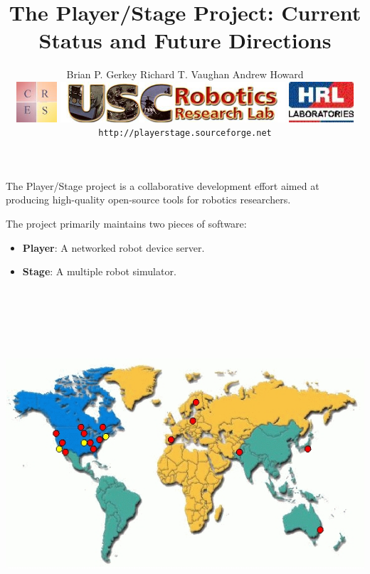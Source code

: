 \documentclass[30pt,landscape,magscalefonts]{foils}
\title{\textcolor{myred}
{\large The Player/Stage Project: Current Status and Future
Directions\vspace*{1em}}}
\author{\small Brian P. Gerkey\hspace{1.5em} Richard T. Vaughan\hspace{1.5em}
Andrew Howard\vspace*{1em}\\
\includegraphics[height=15mm]{cres-logo.jpg}
\includegraphics[height=15mm]{usclogo.jpg}\hspace*{2em}
\includegraphics[height=15mm]{hrl_logo.jpg} \vspace*{1em}\\
{\tt \small http://playerstage.sourceforge.net}}
\date{}
\newcommand{\foilheadc}[1]{\foilhead{\Large \textcolor{myred}{#1}}\vspace*{-2em}}
\begin{document}
\maketitle

\pagebreak\setcounter{page}{2}

\MyLogo{\textcolor{myblue}{SDR PI Meeting, March 2003}}

\foilheadc{Project overview}
The Player/Stage project is a collaborative development effort aimed at
producing high-quality open-source tools for robotics researchers.

\vspace{1em}
The project primarily maintains two pieces of software:
\begin{itemize}
\item {\bf Player}: A networked robot device server.
\item {\bf Stage}: A multiple robot simulator.
\end{itemize}

\foilheadc{Usage}
\begin{center}
\includegraphics[height=130mm]{usage-map.jpg}
\end{center}
\end{document}
